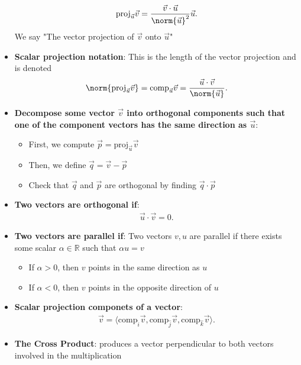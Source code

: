 \documentclass{report}
\begin{document}
\begin{itemize}
        \begin{align*}
            \text{proj}_{\vec{u}}\vec{v} = \frac{\vec{v} \cdot \vec{u}}{\norm{\vec{u}}^{2}}\vec{u}
        .\end{align*}
        We say "The vector projection of $\vec{v}$ onto $\vec{u}$"
    \item \textbf{Scalar projection notation}: This is the length of the vector projection and is denoted
        \begin{align*}
            \norm{\text{proj}_{\vec{u}}\vec{v}} = \text{comp}_{\vec{u}}\vec{v} = \frac{\vec{u} \cdot \vec{v}}{\norm{\vec{u}}}
        .\end{align*}
    \item \textbf{Decompose some vector $\vec{v}$ into orthogonal components such that one of the component vectors has the same direction as  $\vec{u}$}:
        \begin{itemize}
            \item First, we compute $\vec{p} = \text{proj}_{\vec{u}}\vec{v} $
            \item Then, we define $\vec{q}  = \vec{v} - \vec{p}$ 
            \item Check that $\vec{q}$ and $\vec{p}$ are orthogonal by finding $\vec{q} \cdot \vec{p}$
        \end{itemize}
    \item \textbf{Two vectors are orthogonal if}:
        \begin{align*}
            \vec{u} \cdot \vec{v} = 0
        .\end{align*}
    \item \textbf{Two vectors are parallel if}: Two vectors $v,u$ are parallel if there exists some scalar $\alpha \in \mathbb{R}$ such that $\alpha u = v $
        \bigbreak \noindent 
        \begin{itemize}
            \item If $ \alpha > 0$, then $v$ points in the same direction as $u$
            \item If $ \alpha < 0$, then $v$ points in the opposite direction of $u$
        \end{itemize}
    \item \textbf{Scalar projection componets of a vector}:
        \begin{align*}
            \vec{v} = \langle \text{comp}_{\hat{i}}\vec{v}, \text{comp}_{\hat{j}}\vec{v}, \text{comp}_{\hat{k}}\vec{v}\rangle
        .\end{align*}
    \item \textbf{The Cross Product}: produces a vector perpendicular to both vectors involved in the multiplication

\end{itemize}
\end{document}
